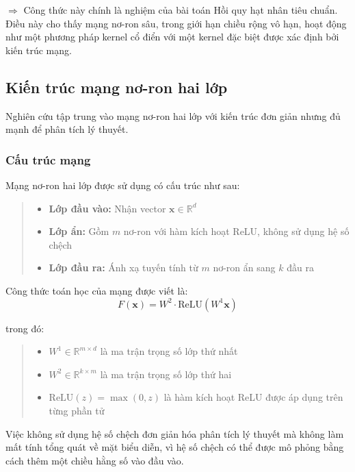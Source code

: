 $\Rightarrow$ Công thức này chính là nghiệm của bài toán Hồi quy hạt nhân tiêu chuẩn. Điều này cho thấy mạng nơ-ron sâu, trong giới hạn chiều rộng vô hạn, hoạt động như một phương pháp kernel cổ điển với một kernel đặc biệt được xác định bởi kiến trúc mạng.

\subsection{Kiến trúc mạng nơ-ron hai lớp}

Nghiên cứu tập trung vào mạng nơ-ron hai lớp với kiến trúc đơn giản nhưng đủ mạnh để phân tích lý thuyết.

\subsubsection{Cấu trúc mạng}

Mạng nơ-ron hai lớp được sử dụng có cấu trúc như sau:
\begin{quote}
\begin{itemize}
    \item \textbf{Lớp đầu vào:} Nhận vector $\mathbf{x} \in \mathbb{R}^d$
    \item \textbf{Lớp ẩn:} Gồm $m$ nơ-ron với hàm kích hoạt ReLU, không sử dụng hệ số chệch
    \item \textbf{Lớp đầu ra:} Ánh xạ tuyến tính từ $m$ nơ-ron ẩn sang $k$ đầu ra
\end{itemize}
\end{quote}

Công thức toán học của mạng được viết là:
\begin{equation}
    F(\mathbf{x}) = W^2 \cdot \text{ReLU}(W^1 \mathbf{x})
\end{equation}

trong đó:
\begin{quote}
\begin{itemize}
    \item $W^1 \in \mathbb{R}^{m \times d}$ là ma trận trọng số lớp thứ nhất
    \item $W^2 \in \mathbb{R}^{k \times m}$ là ma trận trọng số lớp thứ hai
    \item $\text{ReLU}(z) = \max(0, z)$ là hàm kích hoạt ReLU được áp dụng trên từng phần tử
\end{itemize}
\end{quote}

Việc không sử dụng hệ số chệch đơn giản hóa phân tích lý thuyết mà không làm mất tính tổng quát về mặt biểu diễn, vì hệ số chệch có thể được mô phỏng bằng cách thêm một chiều hằng số vào đầu vào.

